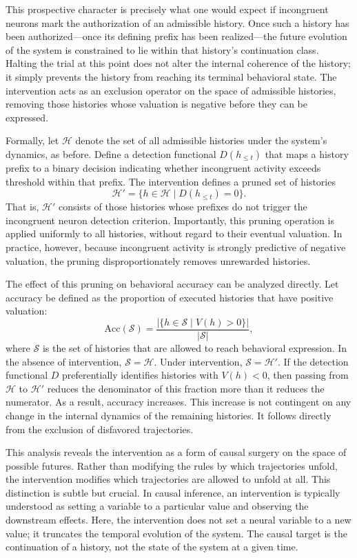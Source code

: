 \documentclass[11pt]{article}
\newcommand{\histories}{\mathcal{H}}
\newcommand{\valuation}{V}
\begin{document}
This prospective character is precisely what one would expect if incongruent neurons mark the authorization of an admissible history. Once such a history has been authorized—once its defining prefix has been realized—the future evolution of the system is constrained to lie within that history’s continuation class. Halting the trial at this point does not alter the internal coherence of the history; it simply prevents the history from reaching its terminal behavioral state. The intervention acts as an exclusion operator on the space of admissible histories, removing those histories whose valuation is negative before they can be expressed.

Formally, let $\histories$ denote the set of all admissible histories under the system’s dynamics, as before. Define a detection functional $D(h_{\le t})$ that maps a history prefix to a binary decision indicating whether incongruent activity exceeds threshold within that prefix. The intervention defines a pruned set of histories
\[
\histories' = \{ h \in \histories \mid D(h_{\le t}) = 0 \}.
\]
That is, $\histories'$ consists of those histories whose prefixes do not trigger the incongruent neuron detection criterion. Importantly, this pruning operation is applied uniformly to all histories, without regard to their eventual valuation. In practice, however, because incongruent activity is strongly predictive of negative valuation, the pruning disproportionately removes unrewarded histories.

The effect of this pruning on behavioral accuracy can be analyzed directly. Let accuracy be defined as the proportion of executed histories that have positive valuation:
\[
\mathrm{Acc}(\mathcal{S}) = \frac{|\{ h \in \mathcal{S} \mid \valuation(h) > 0 \}|}{|\mathcal{S}|},
\]
where $\mathcal{S}$ is the set of histories that are allowed to reach behavioral expression. In the absence of intervention, $\mathcal{S} = \histories$. Under intervention, $\mathcal{S} = \histories'$. If the detection functional $D$ preferentially identifies histories with $\valuation(h) < 0$, then passing from $\histories$ to $\histories'$ reduces the denominator of this fraction more than it reduces the numerator. As a result, accuracy increases. This increase is not contingent on any change in the internal dynamics of the remaining histories. It follows directly from the exclusion of disfavored trajectories.

This analysis reveals the intervention as a form of causal surgery on the space of possible futures. Rather than modifying the rules by which trajectories unfold, the intervention modifies which trajectories are allowed to unfold at all. This distinction is subtle but crucial. In causal inference, an intervention is typically understood as setting a variable to a particular value and observing the downstream effects. Here, the intervention does not set a neural variable to a new value; it truncates the temporal evolution of the system. The causal target is the continuation of a history, not the state of the system at a given time.
\end{document}
